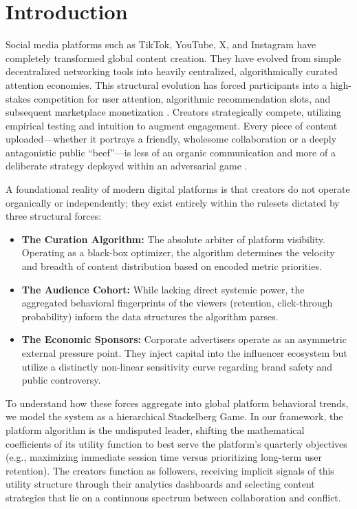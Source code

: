 \documentclass[12pt,letterpaper]{article}
\begin{document}
\section{Introduction}
Social media platforms such as TikTok, YouTube, X, and Instagram have completely transformed global content creation. They have evolved from simple decentralized networking tools into heavily centralized, algorithmically curated attention economies. This structural evolution has forced participants into a high-stakes competition for user attention, algorithmic recommendation slots, and subsequent marketplace monetization \cite{bakshy2015}. Creators strategically compete, utilizing empirical testing and intuition to augment engagement. Every piece of content uploaded—whether it portrays a friendly, wholesome collaboration or a deeply antagonistic public ``beef''—is less of an organic communication and more of a deliberate strategy deployed within an adversarial game \cite{ferrara2016}.

A foundational reality of modern digital platforms is that creators do not operate organically or independently; they exist entirely within the rulesets dictated by three structural forces:
\begin{itemize}
\item \textbf{The Curation Algorithm:} The absolute arbiter of platform visibility. Operating as a black-box optimizer, the algorithm determines the velocity and breadth of content distribution based on encoded metric priorities.
\item \textbf{The Audience Cohort:} While lacking direct systemic power, the aggregated behavioral fingerprints of the viewers (retention, click-through probability) inform the data structures the algorithm parses.
\item \textbf{The Economic Sponsors:} Corporate advertisers operate as an asymmetric external pressure point. They inject capital into the influencer ecosystem but utilize a distinctly non-linear sensitivity curve regarding brand safety and public controversy.
\end{itemize}

To understand how these forces aggregate into global platform behavioral trends, we model the system as a hierarchical Stackelberg Game. In our framework, the platform algorithm is the undisputed leader, shifting the mathematical coefficients of its utility function to best serve the platform's quarterly objectives (e.g., maximizing immediate session time versus prioritizing long-term user retention). The creators function as followers, receiving implicit signals of this utility structure through their analytics dashboards and selecting content strategies that lie on a continuous spectrum between collaboration and conflict.
\end{document}

